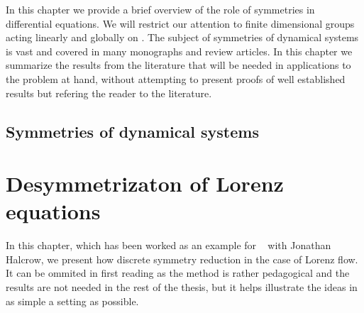 
In this chapter we provide a brief overview of the role of
symmetries in differential equations. We will restrict our
attention to finite dimensional groups acting linearly and
globally on . The subject of symmetries of dynamical
systems is vast and covered in many monographs and review articles.
In this chapter we summarize the results from the literature
that will be needed in applications to the problem at hand, without
attempting to present proofs of well established results but refering
the reader to the literature.

 \section{Symmetries of dynamical systems}
        \label{sec:symIntro}
        



\chapter{Desymmetrizaton of Lorenz equations}
\label{chap:Lorenz}
	In this chapter, which has been worked as an example for
	\wwwcb~ with Jonathan Halcrow, we present how discrete symmetry reduction in
	the case of Lorenz flow. It can be ommited in first reading
	as the method is rather pedagogical and the results are not
	needed in the rest of the thesis, but it helps illustrate the
	ideas in as simple a setting as possible.
    

